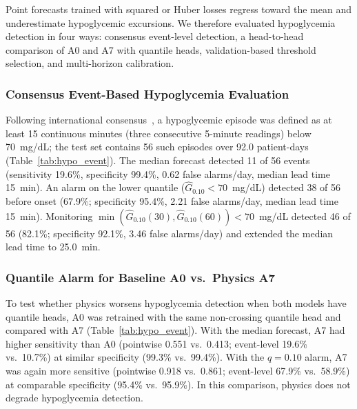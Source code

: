 \documentclass[journal]{IEEEtran}
\begin{document}
Point forecasts trained with squared or Huber losses regress toward the mean and underestimate hypoglycemic excursions. We therefore evaluated hypoglycemia detection in four ways: consensus event-level detection, a head-to-head comparison of A0 and A7 with quantile heads, validation-based threshold selection, and multi-horizon calibration.

\subsubsection{Consensus Event-Based Hypoglycemia Evaluation}
Following international consensus~\cite{ref52}, a hypoglycemic episode was defined as at least 15 continuous minutes (three consecutive 5-minute readings) below 70~mg/dL; the test set contains 56 such episodes over 92.0 patient-days (Table~\ref{tab:hypo_event}). The median forecast detected 11 of 56 events (sensitivity 19.6\%, specificity 99.4\%, 0.62 false alarms/day, median lead time 15~min). An alarm on the lower quantile ($\hat{G}_{0.10} < 70$~mg/dL) detected 38 of 56 before onset (67.9\%; specificity 95.4\%, 2.21 false alarms/day, median lead time 15~min). Monitoring $\min(\hat{G}_{0.10}(30), \hat{G}_{0.10}(60)) < 70$~mg/dL detected 46 of 56 (82.1\%; specificity 92.1\%, 3.46 false alarms/day) and extended the median lead time to 25.0~min.

\subsubsection{Quantile Alarm for Baseline A0 vs.\ Physics A7}
\label{sec:quantile_a0_a7}
To test whether physics worsens hypoglycemia detection when both models have quantile heads, A0 was retrained with the same non-crossing quantile head and compared with A7 (Table~\ref{tab:hypo_event}). With the median forecast, A7 had higher sensitivity than A0 (pointwise 0.551 vs.\ 0.413; event-level 19.6\% vs.\ 10.7\%) at similar specificity (99.3\% vs.\ 99.4\%). With the $q = 0.10$ alarm, A7 was again more sensitive (pointwise 0.918 vs.\ 0.861; event-level 67.9\% vs.\ 58.9\%) at comparable specificity (95.4\% vs.\ 95.9\%). In this comparison, physics does not degrade hypoglycemia detection.
\end{document}
